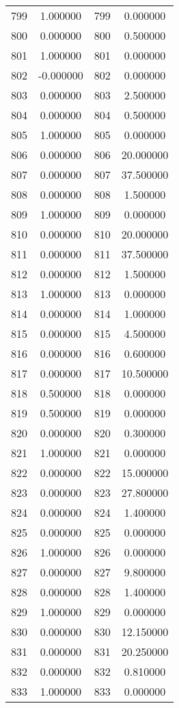 \documentclass[12pt]{article}
\begin{document}
\begin{longtable}{@{}cccc@{}}
799 & 1.000000 & 799 & 0.000000 \\
800 & 0.000000 & 800 & 0.500000 \\
801 & 1.000000 & 801 & 0.000000 \\
802 & -0.000000 & 802 & 0.000000 \\
803 & 0.000000 & 803 & 2.500000 \\
804 & 0.000000 & 804 & 0.500000 \\
805 & 1.000000 & 805 & 0.000000 \\
806 & 0.000000 & 806 & 20.000000 \\
807 & 0.000000 & 807 & 37.500000 \\
808 & 0.000000 & 808 & 1.500000 \\
809 & 1.000000 & 809 & 0.000000 \\
810 & 0.000000 & 810 & 20.000000 \\
811 & 0.000000 & 811 & 37.500000 \\
812 & 0.000000 & 812 & 1.500000 \\
813 & 1.000000 & 813 & 0.000000 \\
814 & 0.000000 & 814 & 1.000000 \\
815 & 0.000000 & 815 & 4.500000 \\
816 & 0.000000 & 816 & 0.600000 \\
817 & 0.000000 & 817 & 10.500000 \\
818 & 0.500000 & 818 & 0.000000 \\
819 & 0.500000 & 819 & 0.000000 \\
820 & 0.000000 & 820 & 0.300000 \\
821 & 1.000000 & 821 & 0.000000 \\
822 & 0.000000 & 822 & 15.000000 \\
823 & 0.000000 & 823 & 27.800000 \\
824 & 0.000000 & 824 & 1.400000 \\
825 & 0.000000 & 825 & 0.000000 \\
826 & 1.000000 & 826 & 0.000000 \\
827 & 0.000000 & 827 & 9.800000 \\
828 & 0.000000 & 828 & 1.400000 \\
829 & 1.000000 & 829 & 0.000000 \\
830 & 0.000000 & 830 & 12.150000 \\
831 & 0.000000 & 831 & 20.250000 \\
832 & 0.000000 & 832 & 0.810000 \\
833 & 1.000000 & 833 & 0.000000 \\

\end{longtable}
\end{document}

